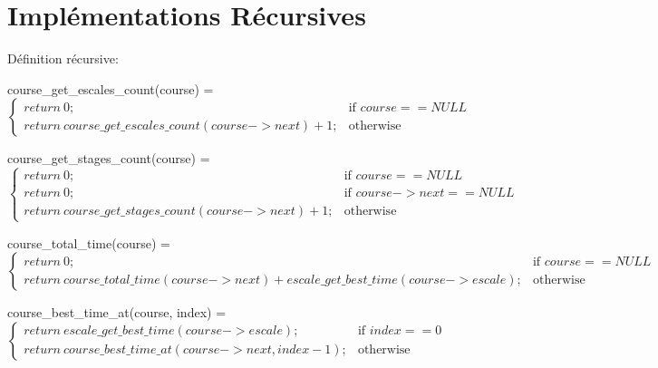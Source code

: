 \section{Implémentations Récursives}\label{recursivite}

Définition récursive:


course\_get\_escales\_count(course) = $
                \begin{cases}
                    return\ 0; & \text{if } course == NULL \\
                    return\ course\_get\_escales\_count(course->next) + 1; & \text{otherwise}
                \end{cases} $


course\_get\_stages\_count(course) = $
                \begin{cases}
                    return\ 0; & \text{if } course == NULL \\
                    return\ 0; & \text{if } course->next == NULL \\
                    return\ course\_get\_stages\_count(course->next) + 1; & \text{otherwise}
                \end{cases} $

course\_total\_time(course) = $
                \begin{cases}
                    return\ 0; & \text{if } course == NULL \\
                    return\ course\_total\_time(course->next) + escale\_get\_best\_time(course->escale); & \text{otherwise}
                \end{cases} $

course\_best\_time\_at(course, index) = $
                \begin{cases}
                    return\ escale\_get\_best\_time(course->escale); & \text{if } index == 0 \\
                    return\ course\_best\_time\_at(course->next, index - 1); & \text{otherwise}
                \end{cases} $


